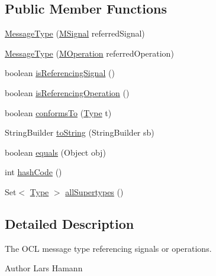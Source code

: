 \subsection*{Public Member Functions}
\begin{DoxyCompactItemize}
\item 
\hyperlink{classorg_1_1tzi_1_1use_1_1uml_1_1ocl_1_1type_1_1_message_type_a7d2481613a2708fca335ff5f9beda526}{Message\-Type} (\hyperlink{interfaceorg_1_1tzi_1_1use_1_1uml_1_1mm_1_1commonbehavior_1_1communications_1_1_m_signal}{M\-Signal} referred\-Signal)
\item 
\hyperlink{classorg_1_1tzi_1_1use_1_1uml_1_1ocl_1_1type_1_1_message_type_a574d50838c457ea1639762083e334ae3}{Message\-Type} (\hyperlink{classorg_1_1tzi_1_1use_1_1uml_1_1mm_1_1_m_operation}{M\-Operation} referred\-Operation)
\item 
boolean \hyperlink{classorg_1_1tzi_1_1use_1_1uml_1_1ocl_1_1type_1_1_message_type_a6744e2cf8c5b1c2ce420b49b44466af0}{is\-Referencing\-Signal} ()
\item 
boolean \hyperlink{classorg_1_1tzi_1_1use_1_1uml_1_1ocl_1_1type_1_1_message_type_aded1232fe41ff23847dcccbbf9d82e5e}{is\-Referencing\-Operation} ()
\item 
boolean \hyperlink{classorg_1_1tzi_1_1use_1_1uml_1_1ocl_1_1type_1_1_message_type_af6064aee9ce2efc6da5e7afa690e2780}{conforms\-To} (\hyperlink{interfaceorg_1_1tzi_1_1use_1_1uml_1_1ocl_1_1type_1_1_type}{Type} t)
\item 
String\-Builder \hyperlink{classorg_1_1tzi_1_1use_1_1uml_1_1ocl_1_1type_1_1_message_type_a5e85c30d030cf567ae4238c664e831ac}{to\-String} (String\-Builder sb)
\item 
boolean \hyperlink{classorg_1_1tzi_1_1use_1_1uml_1_1ocl_1_1type_1_1_message_type_aadb670bfc09dc08d906033b7d7fbb7cb}{equals} (Object obj)
\item 
int \hyperlink{classorg_1_1tzi_1_1use_1_1uml_1_1ocl_1_1type_1_1_message_type_a4b1501ee3a94ed54060dce5372c9a832}{hash\-Code} ()
\item 
Set$<$ \hyperlink{interfaceorg_1_1tzi_1_1use_1_1uml_1_1ocl_1_1type_1_1_type}{Type} $>$ \hyperlink{classorg_1_1tzi_1_1use_1_1uml_1_1ocl_1_1type_1_1_message_type_ae8a293d25fae6c418b1304baf71e0078}{all\-Supertypes} ()
\end{DoxyCompactItemize}


\subsection{Detailed Description}
The O\-C\-L message type referencing signals or operations. \begin{DoxyAuthor}{Author}
Lars Hamann 
\end{DoxyAuthor}


